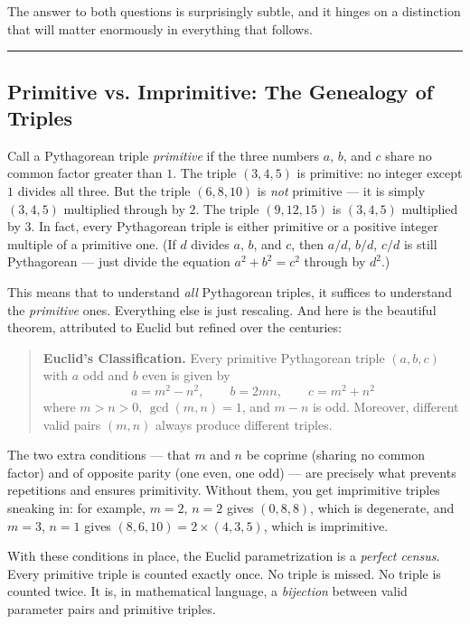 \documentclass[12pt, letterpaper, openany]{book}
\theoremstyle{definition}
\theoremstyle{remark}
\begin{document}
The answer to both questions is surprisingly subtle, and it hinges on a distinction that will matter enormously in everything that follows.


\bigskip\noindent\rule{\textwidth}{0.4pt}\bigskip



\subsection*{Primitive vs. Imprimitive: The Genealogy of Triples}


Call a Pythagorean triple \textit{primitive} if the three numbers $a$, $b$, and $c$ share no common factor greater than $1$. The triple $(3, 4, 5)$ is primitive: no integer except $1$ divides all three. But the triple $(6, 8, 10)$ is \textit{not} primitive --- it is simply $(3, 4, 5)$ multiplied through by $2$. The triple $(9, 12, 15)$ is $(3, 4, 5)$ multiplied by $3$. In fact, every Pythagorean triple is either primitive or a positive integer multiple of a primitive one. (If $d$ divides $a$, $b$, and $c$, then $a/d$, $b/d$, $c/d$ is still Pythagorean --- just divide the equation $a^2 + b^2 = c^2$ through by $d^2$.)

This means that to understand \textit{all} Pythagorean triples, it suffices to understand the \textit{primitive} ones. Everything else is just rescaling. And here is the beautiful theorem, attributed to Euclid but refined over the centuries:


\begin{quote}
\textbf{Euclid's Classification.} Every primitive Pythagorean triple $(a, b, c)$ with $a$ odd and $b$ even is given by
$$a = m^2 - n^2, \qquad b = 2mn, \qquad c = m^2 + n^2$$
where $m > n > 0$, $\gcd(m, n) = 1$, and $m - n$ is odd. Moreover, different valid pairs $(m, n)$ always produce different triples.
\end{quote}


The two extra conditions --- that $m$ and $n$ be coprime (sharing no common factor) and of opposite parity (one even, one odd) --- are precisely what prevents repetitions and ensures primitivity. Without them, you get imprimitive triples sneaking in: for example, $m = 2$, $n = 2$ gives $(0, 8, 8)$, which is degenerate, and $m = 3$, $n = 1$ gives $(8, 6, 10) = 2 \times (4, 3, 5)$, which is imprimitive.

With these conditions in place, the Euclid parametrization is a \textit{perfect census}. Every primitive triple is counted exactly once. No triple is missed. No triple is counted twice. It is, in mathematical language, a \textit{bijection} between valid parameter pairs and primitive triples.
\end{document}
